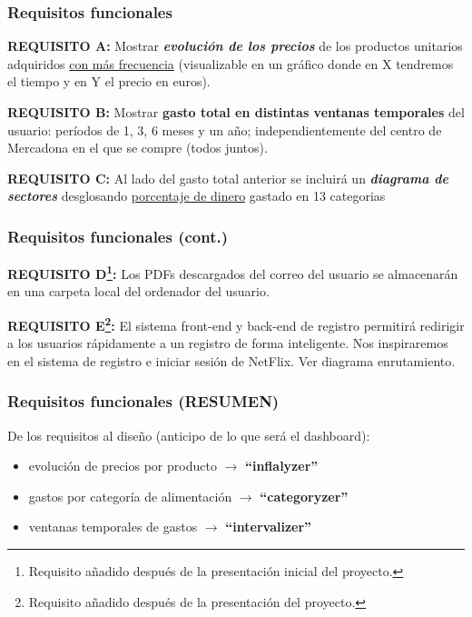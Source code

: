 \documentclass{beamer}
\begin{document}
		
			
	
			
			
		
				\begin{frame}
					\frametitle{Requisitos funcionales}
					
					
					\textbf{REQUISITO A:} Mostrar\textbf{ \textit{evolución de los precios}} de los productos unitarios adquiridos \underline{con más frecuencia} (visualizable en un gráfico donde en X tendremos el tiempo y en Y el precio en euros).
					
					\textbf{REQUISITO B:} Mostrar {\textbf{gasto total en distintas ventanas temporales}} del usuario: períodos de 1, 3, 6 meses y un año; independientemente del centro de Mercadona en el que se compre (todos juntos).
					
					\textbf{REQUISITO C:} Al lado del gasto total anterior se incluirá un \textbf{\textit{diagrama de sectores}} desglosando \underline{porcentaje de dinero} gastado en 13 categorias \href{https://shorturl.at/whzPf}{\color{blue}{(click para ver categorías)}}
					
				\end{frame}
				
				
				
							
				\begin{frame}
					\frametitle{Requisitos funcionales (cont.)}
					
				
					
					\textbf{REQUISITO D\footnote{Requisito añadido después de la presentación inicial del proyecto.}:} Los PDFs descargados del correo del usuario se almacenarán en una carpeta local del ordenador del usuario.
					
					\textbf{REQUISITO E\footnote{Requisito añadido después de la presentación del proyecto.}:} El sistema front-end y back-end de registro permitirá redirigir a los usuarios rápidamente a un registro de forma inteligente. Nos inspiraremos en el sistema de  registro e iniciar sesión de NetFlix. Ver diagrama enrutamiento.
	
				\end{frame}
			
			
			
									
				\begin{frame}
					\frametitle{Requisitos funcionales (RESUMEN)}
					
					
					De los requisitos al diseño (anticipo de lo que será el dashboard):
				
					\begin{itemize}
						\item evolución de precios por producto $\rightarrow$ \textbf{``inflalyzer''}
						\item gastos por categoría de alimentación $\rightarrow$  \textbf{``categoryzer''}
						\item ventanas temporales de gastos $\rightarrow$  \textbf{``intervalizer''}
					\end{itemize}
					
				\end{frame}
			
\end{document}
